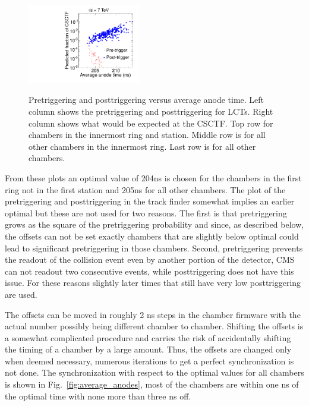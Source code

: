\begin{figure}
\begin{center}
      \includegraphics[clip=true, trim=0.0cm 0cm 3.0cm 0cm, width=0.44\textwidth]{figures/timing/Ring2_Anode_vs_TF_all} \\
      \renewcommand\baselinestretch{1}\caption[Gluino1200f100 System Pt vs MET]
      {Pretriggering and posttriggering versus average anode time. Left column shows the pretriggering and posttriggering for LCTs.
Right column shows what would be expected at the CSCTF. Top row for chambers in the innermost ring and station. Middle row is for all other chambers in the innermost ring.
Last row is for all other chambers.
        }
      \renewcommand\baselinestretch{\@spacing}
      \label{fig:AnodevsprePost}
  \end{center}
\end{figure}

From these plots an optimal value of 204ns is chosen for the chambers in the first ring not in the first station and 205ns for all other chambers.
The plot of the pretriggering and posttriggering in the track finder somewhat implies an earlier optimal but these are not used for two reasons.
The first is that pretriggering grows as the square of the pretriggering probability and since, as described below, the offsets can not be set exactly chambers
that are slightly below optimal could lead to significant pretriggering in those chambers. Second, pretriggering prevents the readout of the collision event even by
another portion of the detector, CMS can not readout two consecutive events, while posttriggering does not have this issue. For these reasons slightly later times
that still have very low posttriggering are used.

The offsets can be moved in roughly 2 ns steps in the chamber firmware with the actual number possibly being different chamber to chamber. Shifting the offsets is a
somewhat complicated procedure and carries the risk of accidentally shifting the timing of a chamber by a large amount. Thus, the offsets are changed only
when deemed necessary, numerous iterations to get a perfect synchronization is not done. The synchronization with respect to the optimal values for all chambers
is shown in Fig.~\ref{fig:average_anodes}, most of the chambers are within one ns of the optimal time with none more than three ns off.


